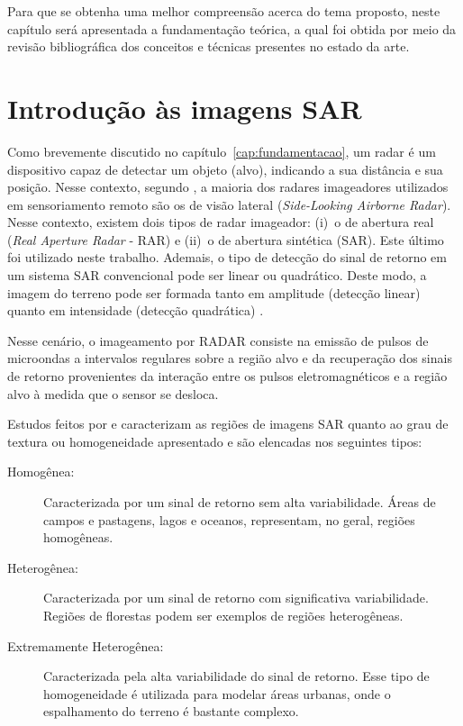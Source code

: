
Para que se obtenha uma melhor compreensão acerca do tema proposto, neste  capítulo  será  apresentada  a  fundamentação teórica, a qual foi obtida por meio da revisão bibliográfica dos conceitos e técnicas presentes no estado da arte.

\section{Introdução às imagens SAR}

Como brevemente discutido no capítulo~\ref{cap:fundamentacao}, um radar é um dispositivo capaz de detectar um objeto (alvo), indicando a sua distância e sua posição. 
Nesse contexto, segundo \citet{dissert_torres}, a maioria dos radares imageadores utilizados em sensoriamento remoto são os de visão lateral (\textit{Side-Looking Airborne Radar}). 
Nesse contexto, existem dois tipos de radar imageador: 
(i)~o de abertura real (\textit{Real Aperture Radar} - RAR) e 
(ii)~o de abertura sintética (SAR). 
Este último foi utilizado neste trabalho. 
Ademais, o tipo de detecção do sinal de retorno em um sistema SAR convencional pode ser linear ou quadrático. 
Deste modo, a imagem do terreno pode ser formada tanto em amplitude (detecção linear) quanto em intensidade (detecção quadrática) \citep{dissert_lucca}. 

Nesse cenário, o imageamento por RADAR consiste na emissão de pulsos de microondas a intervalos regulares sobre a região alvo e da recuperação dos sinais de retorno provenientes da interação entre os pulsos eletromagnéticos e a região alvo à medida que o sensor se desloca.  

Estudos feitos por \citet{Clutter1997} e \citet{Gao2010StatisticalMO} caracterizam as regiões de imagens SAR quanto ao grau de textura ou homogeneidade apresentado e são elencadas nos seguintes tipos:
\begin{description}
    \item[Homogênea:] Caracterizada por um sinal de retorno sem alta variabilidade. Áreas de campos e pastagens, lagos e oceanos, representam, no geral, regiões homogêneas.
    \item[Heterogênea:] Caracterizada por um sinal de retorno com significativa variabilidade. Regiões de florestas podem ser exemplos de regiões heterogêneas.
    \item[Extremamente Heterogênea:] Caracterizada pela alta variabilidade do sinal de retorno. Esse tipo de homogeneidade é utilizada para modelar áreas urbanas, onde o espalhamento do terreno é bastante complexo.
\end{description}

